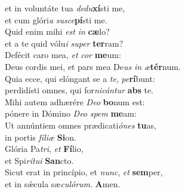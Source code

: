 \oddverse  et in voluntáte tua \textit{de}\textit{du}\textbf{xí}sti me,~\*\\
\oddverse et cum glóri\textit{a} \textit{su}\textit{sce}\textbf{pí}sti me.\\
\evenverse Quid enim mihi \textit{est} \textit{in} \textbf{cæ}lo?~\*\\
\evenverse et a te quid vólu\textit{i} \textit{su}\textit{per} \textbf{ter}ram?\\
\oddverse Defécit caro mea, \textit{et} \textit{cor} \textbf{me}um:~\*\\
\oddverse Deus cordis mei, et pars mea De\textit{us} \textit{in} \textit{æ}\textbf{tér}num.\\
\evenverse Quia ecce, qui elóngant se a \textit{te}, \textit{pe}\textbf{rí}bunt:~\*\\
\evenverse perdidísti omnes, qui for\textit{ni}\textit{cán}\textit{tur} \textbf{abs} te.\\
\oddverse Mihi autem adhærére \textit{De}\textit{o} \textbf{bo}num est:~\*\\
\oddverse pónere in Dómino \textit{De}\textit{o} \textit{spem} \textbf{me}am:\\
\evenverse Ut annúntiem omnes prædicati\textit{ó}\textit{nes} \textbf{tu}as,~\*\\
\evenverse in portis \textit{fí}\textit{li}\textit{æ} \textbf{Si}on.\\
\oddverse Glória Pa\textit{tri}, \textit{et} \textbf{Fí}lio,~\*\\
\oddverse et Spi\textit{rí}\textit{tu}\textit{i} \textbf{San}cto.\\
\evenverse Sicut erat in princípio, et \textit{nunc}, \textit{et} \textbf{sem}per,~\*\\
\evenverse et in sǽcula sæ\textit{cu}\textit{ló}\textit{rum}. \textbf{A}men.\\
